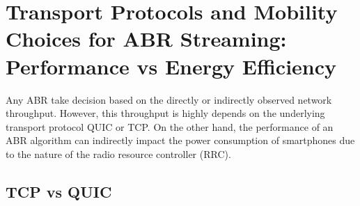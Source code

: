 \section{Transport Protocols and Mobility Choices for ABR Streaming: Performance vs Energy Efficiency}
Any ABR take decision based on the directly or indirectly observed network throughput. However, this throughput is highly depends on the underlying transport protocol QUIC or TCP. On the other hand, the performance of an ABR algorithm can indirectly impact the power consumption of smartphones due to the nature of the radio resource controller (RRC).

\subsection{TCP vs QUIC}